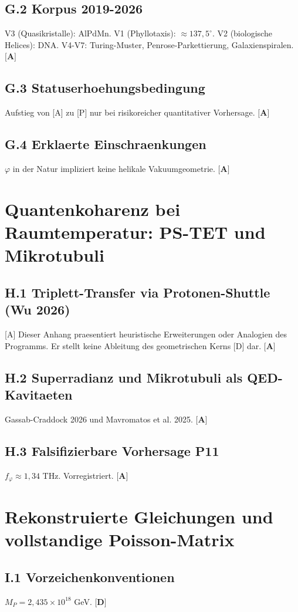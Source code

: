 ﻿\documentclass[11pt,letterpaper]{article}
\begin{document}
\subsection{G.2 Korpus 2019-2026}
V3 (Quasikristalle): AlPdMn. V1 (Phyllotaxis): $\approx 137{,}5^\circ$. V2 (biologische Helices): DNA. V4-V7: Turing-Muster, Penrose-Parkettierung, Galaxienspiralen. $\textbf{[A]}$
\subsection{G.3 Statuserhoehungsbedingung}
Aufstieg von [A] zu [P] nur bei risikoreicher quantitativer Vorhersage. $\textbf{[A]}$
\subsection{G.4 Erklaerte Einschraenkungen}
$\varphi$ in der Natur impliziert keine helikale Vakuumgeometrie. $\textbf{[A]}$
\section{Quantenkoharenz bei Raumtemperatur: PS-TET und Mikrotubuli}
\subsection{H.1 Triplett-Transfer via Protonen-Shuttle (Wu 2026)}
[A] Dieser Anhang praesentiert heuristische Erweiterungen oder Analogien des Programms. Er stellt keine Ableitung des geometrischen Kerns [D] dar. $\textbf{[A]}$
\subsection{H.2 Superradianz und Mikrotubuli als QED-Kavitaeten}
Gassab-Craddock 2026 und Mavromatos et al. 2025. $\textbf{[A]}$
\subsection{H.3 Falsifizierbare Vorhersage P11}
$f_\varphi \approx 1{,}34$ THz. Vorregistriert. $\textbf{[A]}$
\section{Rekonstruierte Gleichungen und vollstandige Poisson-Matrix}
\subsection{I.1 Vorzeichenkonventionen}
$M_P = 2{,}435 \times 10^{18}$ GeV. $\textbf{[D]}$
\end{document}
